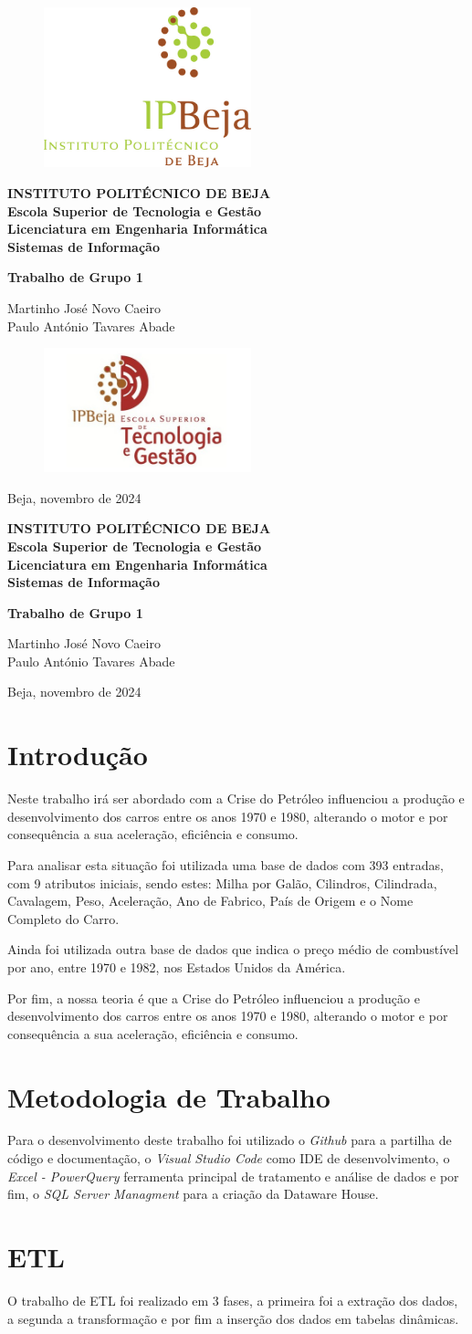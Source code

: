 \documentclass[a4paper]{article}
\newcommand{\firsttitlepage}{
    \begin{titlepage}
        \centering
        \vspace*{1cm}
        
        \begin{figure}[h!]
            \centering
            \includegraphics[width=6cm]{Recursos/LOGO_IPB} %
            \vspace{0.5cm}
        \end{figure}

        \large\textbf{INSTITUTO POLITÉCNICO DE BEJA} \\
        \large\textbf{Escola Superior de Tecnologia e Gestão} \\
        \large\textbf{Licenciatura em Engenharia Informática} \\
        \large\textbf{Sistemas de Informação} \\
        
        \vspace{2cm}
        
        {\Huge \textbf{Trabalho de Grupo 1}} \\
        
        \vspace{1.5cm}
        
        \large Martinho José Novo Caeiro \\
        \large Paulo António Tavares Abade \\
        
        \vfill
        
        \begin{figure}[h!]
            \centering
            \includegraphics[width=6cm]{Recursos/IPBejaESTIG.jpg} %
        \end{figure}
        
        \vspace{1cm}
        
        {\large Beja, novembro de 2024}
    \end{titlepage}
}
\newcommand{\secondtitlepage}{
    \begin{titlepage}
        \centering
        \vspace*{1cm}
        
        \large\textbf{INSTITUTO POLITÉCNICO DE BEJA} \\
        \large\textbf{Escola Superior de Tecnologia e Gestão} \\
        \large\textbf{Licenciatura em Engenharia Informática} \\
        \large\textbf{Sistemas de Informação} \\
        
        \vspace{2cm}
        
        {\Huge \textbf{Trabalho de Grupo 1}} \\
        
        \vspace{1.5cm}
        
        \large Martinho José Novo Caeiro \\
        \large Paulo António Tavares Abade \\
        
        \vfill
        
        {\large Beja, novembro de 2024}
    \end{titlepage}
}
\begin{document}

\firsttitlepage

\secondtitlepage

\newpage
\doublespacing
\tableofcontents
\doublespacing

\newpage
{}

\section{Introdução}\label{intro}
Neste trabalho irá ser abordado com a Crise do Petróleo influenciou a produção e desenvolvimento
dos carros entre os anos 1970 e 1980, alterando o motor e por consequência a sua aceleração, eficiência e consumo.

Para analisar esta situação foi utilizada uma base de dados com 393 entradas, com 9 atributos iniciais, sendo estes:
 Milha por Galão, Cilindros, Cilindrada, Cavalagem, Peso, Aceleração, Ano de Fabrico, País de Origem e o Nome Completo do Carro.

Ainda foi utilizada outra base de dados que indica o preço médio de combustível por ano, entre 1970 e 1982, 
nos Estados Unidos da América.

Por fim, a nossa teoria é que a Crise do Petróleo influenciou a produção e 
desenvolvimento dos carros entre os anos 1970 e 1980, alterando o motor e por consequência a sua aceleração, eficiência e consumo.
\section{Metodologia de Trabalho}\label{met}
Para o desenvolvimento deste trabalho foi utilizado o \textit{Github} para a partilha de código e documentação,
o \textit{Visual Studio Code} como IDE de desenvolvimento, o \textit{Excel - PowerQuery} ferramenta principal de tratamento
e análise de dados e por fim, o \textit{SQL Server Managment} para a criação da Dataware House. 
\section{ETL}\label{etl}
O trabalho de ETL foi realizado em 3 fases, a primeira foi a extração dos dados, 
a segunda a transformação e por fim a inserção dos dados em tabelas dinâmicas.
\end{document}
